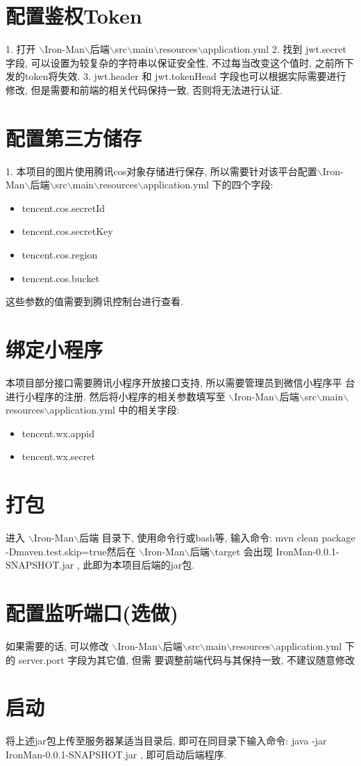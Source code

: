 \section{配置鉴权Token}
1. 打开 $\backslash$Iron-Man$\backslash$后端$\backslash$src$\backslash$main$\backslash$resources$\backslash$application.yml 
2. 找到 jwt.secret 字段, 可以设置为较复杂的字符串以保证安全性, 不过每当改变这个值时, 之前所下发的token将失效. 
3. jwt.header 和 jwt.tokenHead 字段也可以根据实际需要进行修改, 但是需要和前端的相关代码保持一致, 否则将无法进行认证.

\section{配置第三方储存}
1. 本项目的图片使用腾讯cos对象存储进行保存, 所以需要针对该平台配置$\backslash$Iron-Man$\backslash$后端$\backslash$src$\backslash$main$\backslash$resources$\backslash$application.yml 下的四个字段:

\begin{itemize}
    \item tencent.cos.secretId
    \item tencent.cos.secretKey
    \item tencent.cos.region
    \item tencent.cos.bucket
\end{itemize}
这些参数的值需要到腾讯控制台进行查看.

\section{绑定小程序}
本项目部分接口需要腾讯小程序开放接口支持, 所以需要管理员到微信小程序平
台进行小程序的注册. 然后将小程序的相关参数填写至 $\backslash$Iron-Man$\backslash$后端$\backslash$src$\backslash$main$\backslash$resources$\backslash$application.yml  中的相关字段:

\begin{itemize}
    \item tencent.wx.appid
    \item tencent.wx.secret
 
\end{itemize}

\section{打包}
进入 $\backslash$Iron-Man$\backslash$后端 目录下, 使用命令行或bash等, 输入命令: mvn clean package -Dmaven.test.skip=true然后在 $\backslash$Iron-Man$\backslash$后端$\backslash$target 会出现 IronMan-0.0.1-SNAPSHOT.jar , 此即为本项目后端的jar包.

\section{配置监听端口(选做)}

如果需要的话, 可以修改 $\backslash$Iron-Man$\backslash$后端$\backslash$src$\backslash$main$\backslash$resources$\backslash$application.yml 下的 server.port 字段为其它值, 但需
要调整前端代码与其保持一致, 不建议随意修改

\section{启动}

将上述jar包上传至服务器某适当目录后, 即可在同目录下输入命令: java -jar IronMan-0.0.1-SNAPSHOT.jar , 即可启动后端程序.